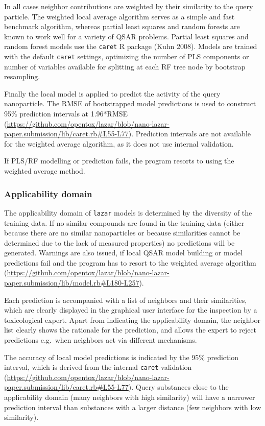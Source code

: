 \documentclass[utf8]{frontiersHLTH} %
\begin{document}
In all cases neighbor contributions are weighted by their similarity to
the query particle. The weighted local average algorithm serves as a
simple and fast benchmark algorithm, whereas partial least squares and
random forests are known to work well for a variety of QSAR problems.
Partial least squares and random forest models use the \texttt{caret} R
package (Kuhn 2008). Models are trained with the default \texttt{caret}
settings, optimizing the number of PLS components or number of variables
available for splitting at each RF tree node by bootstrap resampling.

Finally the local model is applied to predict the activity of the query
nanoparticle. The RMSE of bootstrapped model predictions is used to
construct 95\% prediction intervals at 1.96*RMSE
(\url{https://github.com/opentox/lazar/blob/nano-lazar-paper.submission/lib/caret.rb\#L55-L77}).
Prediction intervals are not available for the weighted average
algorithm, as it does not use internal validation.

If PLS/RF modelling or prediction fails, the program resorts to using
the weighted average method.

\subsubsection{Applicability domain}\label{applicability-domain}

The applicability domain of \texttt{lazar} models is determined by the
diversity of the training data. If no similar compounds are found in the
training data (either because there are no similar nanoparticles or
because similarities cannot be determined due to the lack of measured
properties) no predictions will be generated. Warnings are also issued,
if local QSAR model building or model predictions fail and the program
has to resort to the weighted average algorithm
(\url{https://github.com/opentox/lazar/blob/nano-lazar-paper.submission/lib/model.rb\#L180-L257}).

Each prediction is accompanied with a list of neighbors and their
similarities, which are clearly displayed in the graphical user
interface for the inspection by a toxicological expert. Apart from
indicating the applicability domain, the neighbor list clearly shows the
rationale for the prediction, and allows the expert to reject
predictions e.g.~when neighbors act via different mechanisms.

The accuracy of local model predictions is indicated by the 95\%
prediction interval, which is derived from the internal \texttt{caret}
validation
(\url{https://github.com/opentox/lazar/blob/nano-lazar-paper.submission/lib/caret.rb\#L55-L77}).
Query substances close to the applicability domain (many neighbors with
high similarity) will have a narrower prediction interval than
substances with a larger distance (few neighbors with low similarity).
\end{document}
